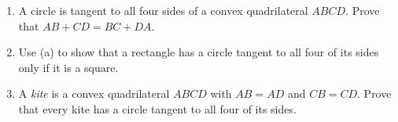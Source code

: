 \begin{enumerate}
\item[(a)] A circle is tangent to all four sides of a convex quadrilateral $ABCD$. Prove that $AB+CD=BC+DA$.
\item[(b)] Use (a) to show that a rectangle has a circle tangent to all four of its sides only if it is a square.
\item[(c)] A \emph{kite} is a convex quadrilateral $ABCD$ with $AB=AD$ and $CB=CD$. Prove that every kite has a circle tangent to all four of its sides.
\end{enumerate}
